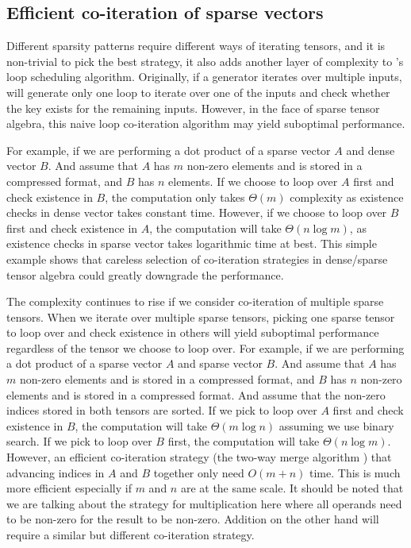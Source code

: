 \documentclass[acmsmall,nonacm]{acmart}\settopmatter{printfolios=true,printccs=false,printacmref=false}
\newcommand{\rhyme}{\text{Rhyme}\xspace}
\begin{document}
\subsection*{Efficient co-iteration of sparse vectors}
\iffalse
Different sparsity patterns require different ways of iterating tensors, and it is non-trivial to pick the best strategy, it also adds another layer of complexity to \rhyme's loop scheduling algorithm. Originally, if a generator iterates over multiple inputs, \rhyme will generate only one loop to iterate over one of the inputs and check whether the key exists for the remaining inputs. However, in the face of sparse tensor algebra, this naive loop co-iteration algorithm may yield suboptimal performance.\par
For example, if we are performing a dot product of a sparse vector $A$ and dense vector $B$. And assume that $A$ has $m$ non-zero elements and is stored in a compressed format, and $B$ has $n$ elements. If we choose to loop over $A$ first and check existence in $B$, the computation only takes $\Theta(m)$ complexity as existence checks in dense vector takes constant time. However, if we choose to loop over $B$ first and check existence in $A$, the computation will take $\Theta(n\log{}m)$, as existence checks in sparse vector takes logarithmic time at best. This simple example shows that careless selection of co-iteration strategies in dense/sparse tensor algebra could greatly downgrade the performance.\par
The complexity continues to rise if we consider co-iteration of multiple sparse tensors. When we iterate over multiple sparse tensors, picking one sparse tensor to loop over and check existence in others will yield suboptimal performance regardless of the tensor we choose to loop over. For example, if we are performing a dot product of a sparse vector $A$ and sparse vector $B$. And assume that $A$ has $m$ non-zero elements and is stored in a compressed format, and $B$ has $n$ non-zero elements and is stored in a compressed format. And assume that the non-zero indices stored in both tensors are sorted. If we pick to loop over $A$ first and check existence in $B$, the computation will take $\Theta(m\log{}n)$ assuming we use binary search. If we pick to loop over $B$ first, the computation will take $\Theta(n\log{}m)$. However, an efficient co-iteration strategy (the two-way merge algorithm \cite{knuth}) that advancing indices in $A$ and $B$ together only need $O(m + n)$ time. This is much more efficient especially if $m$ and $n$ are at the same scale. It should be noted that we are talking about the strategy for multiplication here where all operands need to be non-zero for the result to be non-zero. Addition on the other hand will require a similar but different co-iteration strategy.\par
\end{document}
